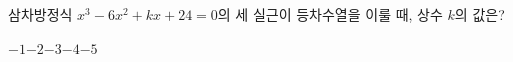 삼차방정식 $x^3-6x^2+kx+24=0$의 세 실근이 등차수열을 이룰 때, 상수 $k$의 값은?
\begin{choices32}{$-1$}{$-2$}{$-3$}{$-4$}{$-5$}\end{choices32}
